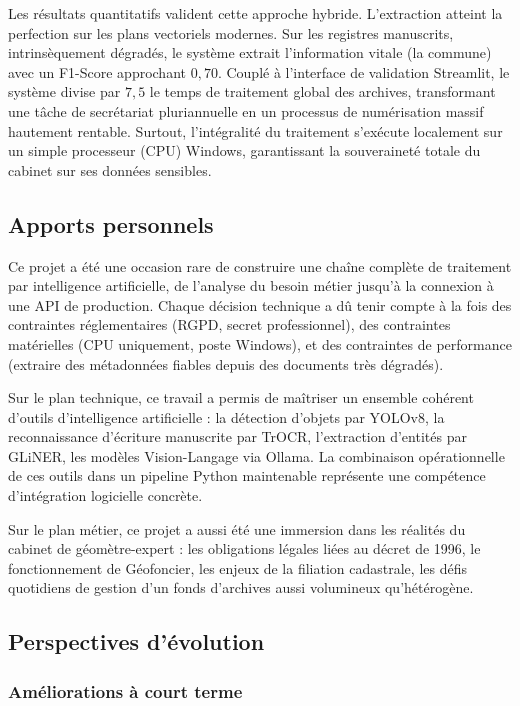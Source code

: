 Les résultats quantitatifs valident cette approche hybride. L'extraction atteint la perfection sur les plans vectoriels modernes. Sur les registres manuscrits, intrinsèquement dégradés, le système extrait l'information vitale (la commune) avec un F1-Score approchant $0{,}70$. Couplé à l'interface de validation Streamlit, le système divise par $7{,}5$ le temps de traitement global des archives, transformant une tâche de secrétariat pluriannuelle en un processus de numérisation massif hautement rentable. Surtout, l'intégralité du traitement s'exécute localement sur un simple processeur (CPU) Windows, garantissant la souveraineté totale du cabinet sur ses données sensibles.

\subsection{Apports personnels}

Ce projet a été une occasion rare de construire une chaîne complète de traitement par intelligence artificielle, de l'analyse du besoin métier jusqu'à la connexion à une API de production. Chaque décision technique a dû tenir compte à la fois des contraintes réglementaires (RGPD, secret professionnel), des contraintes matérielles (CPU uniquement, poste Windows), et des contraintes de performance (extraire des métadonnées fiables depuis des documents très dégradés).

Sur le plan technique, ce travail a permis de maîtriser un ensemble cohérent d'outils d'intelligence artificielle : la détection d'objets par YOLOv8, la reconnaissance d'écriture manuscrite par TrOCR, l'extraction d'entités par GLiNER, les modèles Vision-Langage via Ollama. La combinaison opérationnelle de ces outils dans un pipeline Python maintenable représente une compétence d'intégration logicielle concrète.

Sur le plan métier, ce projet a aussi été une immersion dans les réalités du cabinet de géomètre-expert : les obligations légales liées au décret de 1996, le fonctionnement de Géofoncier, les enjeux de la filiation cadastrale, les défis quotidiens de gestion d'un fonds d'archives aussi volumineux qu'hétérogène.

\subsection{Perspectives d'évolution}

\subsubsection{Améliorations à court terme}

